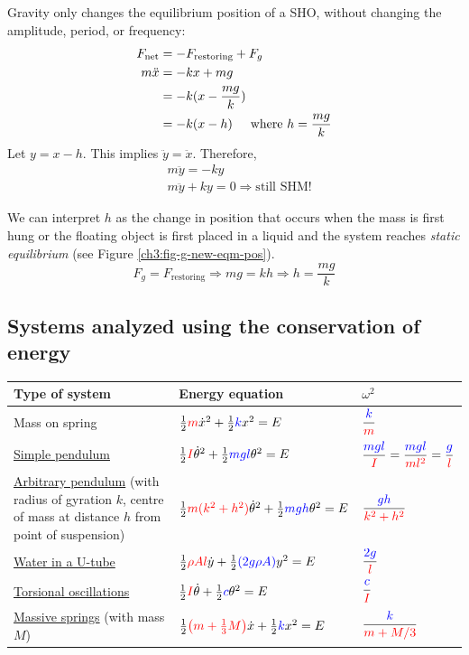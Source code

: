 \documentclass[11pt,letterpaper,titlepage,oneside]{book}
\newcommand{\htab}{\hspace{0.5cm}}
\newcommand{\where}{\htab\text{where }}
\newcommand{\kcol}[1]{\textcolor{blue}{#1}}
\newcommand{\mcol}[1]{\textcolor{red}{#1}}
\begin{document}
Gravity only changes the equilibrium position of a SHO, without changing the amplitude, period, or frequency:
\begin{align*}
	F_\text{net} &= -F_\text{restoring} + F_g \\
	m\ddot{x} &= -kx + mg \\
	& = -k(x - \frac{mg}{k}) \\
	& = -k(x - h) \where h=\frac{mg}{k}
\end{align*}
Let $y=x-h$. This implies $\ddot{y} = \ddot{x}$. Therefore,
\begin{align*}
	&m\ddot{y} = -ky \\
	&m\ddot{y} + ky = 0  \Longrightarrow \text{still SHM!}
\end{align*}

We can interpret $h$ as the change in position that occurs when the mass is first hung or the floating object is first placed in a liquid and the system reaches \emph{static equilibrium} (see Figure \ref{ch3:fig-g-new-eqm-pos}).
\[ F_g = F_\text{restoring}\Longrightarrow mg = kh \Longrightarrow h = \frac{mg}{k} \]


\subsection{Systems analyzed using the conservation of energy}
\begin{center}
	\renewcommand{\arraystretch}{2.5}
	\begin{tabular}[t]{lll}
		\hline
		Type of system & Energy equation & $\omega^2$ \\ \hline
		Mass on spring &
			$\frac{1}{2}\mcol{m}\dot{x}^2 + \frac{1}{2}\kcol{k}x^2 = E $ &
			$\dfrac{\kcol{k}}{\mcol{m}}$
			\\
		\hyperref[ch3:sec-simple-pendulum]{Simple pendulum} &
			$\frac{1}{2}\mcol{I}\dot{\theta}^2 + \frac{1}{2}\kcol{mgl}\theta^2 = E $ &
			$\dfrac{\kcol{mgl}}{\mcol{I}} = \dfrac{\kcol{mgl}}{\mcol{ml^2}}= \dfrac{\kcol{g}}{\mcol{l}}$ 
			\\
		\parbox{5.5cm}{	\hyperref[ch3:sec-complex-pendulum]{Arbitrary pendulum} \footnotesize(with radius of gyration $k$, centre of mass at distance $h$ from point of suspension)}&
			$\frac{1}{2}\mcol{m(k^2+h^2)}\dot{\theta}^2 + \frac{1}{2}\kcol{mgh}\theta^2 = E $ &
			$\dfrac{\kcol{gh}}{\mcol{k^2+h^2}}$ 
			\\
		\hyperref[ch3:sec-uTube]{Water in a U-tube} &
			$\frac{1}{2}\mcol{\rho Al}\dot{y} + \frac{1}{2}\kcol{(2g\rho A)}y^2 = E$ &
			$\dfrac{\kcol{2g}}{\mcol{l}}$ 
			\\
		\hyperref[ch3:sec-torsional]{Torsional oscillations} &
			$\frac{1}{2}\mcol{I}\dot{\theta} + \frac{1}{2}\kcol{c}\theta^2 = E$ &
			$\dfrac{\kcol{c}}{\mcol{I}}$ 
			\\
		\parbox{5cm}{	\hyperref[ch3:sec-massive-springs]{Massive springs} \\\footnotesize{(with mass $M$)}} &
			$\frac{1}{2}\mcol{\left(m + \frac{1}{3}M \right)}\dot{x} + \frac{1}{2}\kcol{k}x^2 = E$ &
			$\dfrac{\kcol{k}}{\mcol{m + M/3}}$ 
			\\
		\hline
	\end{tabular}
	\renewcommand{\arraystretch}{1}
\end{center}
\end{document}
